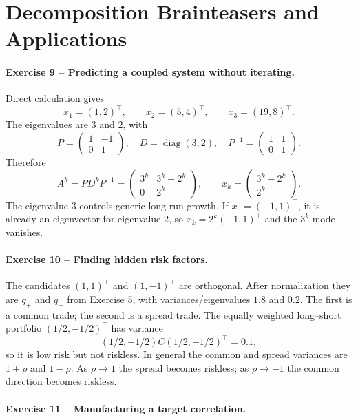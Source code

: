 \documentclass[10pt]{article}
\newcommand{\diag}{\operatorname{diag}}
\begin{document}
\section{Decomposition Brainteasers and Applications}

\paragraph{Exercise 9 -- Predicting a coupled system without iterating.}

Direct calculation gives
\[
x_1=(1,2)^\top,\qquad x_2=(5,4)^\top,\qquad x_3=(19,8)^\top.
\]
The eigenvalues are $3$ and $2$, with
\[
P=\begin{pmatrix}1&-1\\0&1\end{pmatrix},\quad
D=\diag(3,2),\quad
P^{-1}=\begin{pmatrix}1&1\\0&1\end{pmatrix}.
\]
Therefore
\[
A^k=PD^kP^{-1}
=\begin{pmatrix}3^k&3^k-2^k\\0&2^k\end{pmatrix},
\qquad
x_k=\begin{pmatrix}3^k-2^k\\2^k\end{pmatrix}.
\]
The eigenvalue $3$ controls generic long-run growth. If
$x_0=(-1,1)^\top$, it is already an eigenvector for eigenvalue $2$, so
$x_k=2^k(-1,1)^\top$ and the $3^k$ mode vanishes.

\paragraph{Exercise 10 -- Finding hidden risk factors.}

The candidates $(1,1)^\top$ and $(1,-1)^\top$ are orthogonal. After
normalization they are $q_+$ and $q_-$ from Exercise 5, with variances/eigenvalues
$1.8$ and $0.2$. The first is a common trade; the second is a spread trade.
The equally weighted long--short portfolio $(1/2,-1/2)^\top$ has variance
\[
(1/2,-1/2)C(1/2,-1/2)^\top=0.1,
\]
so it is low risk but not riskless. In general the common and spread variances
are $1+\rho$ and $1-\rho$. As $\rho\to1$ the spread becomes riskless; as
$\rho\to-1$ the common direction becomes riskless.

\paragraph{Exercise 11 -- Manufacturing a target correlation.}
\end{document}
